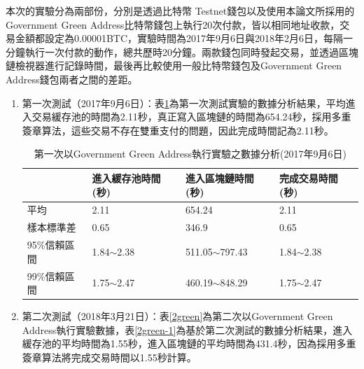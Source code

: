 		本次的實驗分為兩部份，分別是透過比特幣 Testnet錢包以及使用本論文所採用的Government Green Address比特幣錢包上執行20次付款，皆以相同地址收款，交易金額都設定為0.00001BTC，實驗時間為2017年9月6日與2018年2月6日，每隔一分鐘執行一次付款的動作，總共歷時20分鐘。兩款錢包同時發起交易，並透過區塊鏈檢視器進行記錄時間，最後再比較使用一般比特幣錢包及Government Green Address錢包兩者之間的差距。

		\begin{enumerate}
			\item 第一次測試（2017年9月6日）：表\ref{1green}為第一次測試實驗的數據分析結果，平均進入交易緩存池的時間為2.11秒，真正寫入區塊鏈的時間為654.24秒，採用多重簽章算法，這些交易不存在雙重支付的問題，因此完成時間記為2.11秒。

			\begin{table}[!htbp]
				\centering
				\caption{第一次以Government Green Address執行實驗之數據分析(2017年9月6日)}
				\label{1green}
				\begin{tabular}{|l|l|l|l|}
				\hline
				 & 進入緩存池時間(秒) & 進入區塊鏈時間(秒) & 完成交易時間(秒) \\ \hline
				平均 & 2.11 & 654.24 & 2.11 \\ \hline
				樣本標準差 & 0.65 & 346.9 & 0.65 \\ \hline
				95\%信賴區間 & 1.84$\sim$2.38 & 511.05$\sim$797.43 & 1.84$\sim$2.38 \\ \hline
				99\%信賴區間 & 1.75$\sim$2.47 & 460.19$\sim$848.29 & 1.75$\sim$2.47 \\ \hline
				\end{tabular}
				\end{table}

			\item 第二次測試（2018年3月21日）：表\ref{2green}為第二次以Government Green Address執行實驗數據，表\ref{2green-1}為基於第二次測試的數據分析結果，進入緩存池的平均時間為1.55秒，進入區塊鏈的平均時間為431.4秒，因為採用多重簽章算法將完成交易時間以1.55秒計算。

		\end{enumerate}

